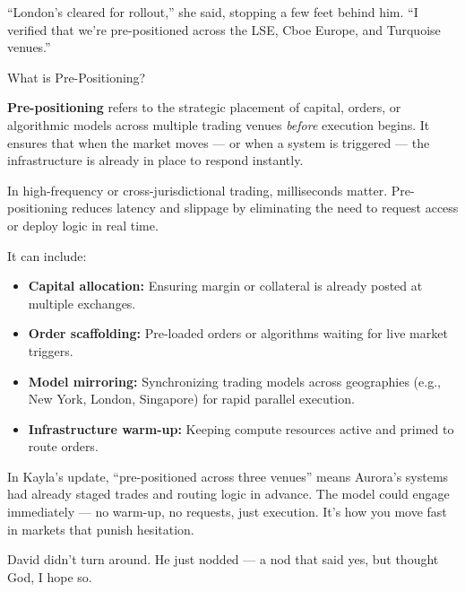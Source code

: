 \medskip

“London’s cleared for rollout,” she said, stopping a few feet behind him. “I verified that we’re pre-positioned 
across the LSE, Cboe Europe, and Turquoise venues.”

\medskip

\begin{TechnicalSidebar}{What is Pre-Positioning?}

  \textbf{Pre-positioning} refers to the strategic placement of capital, orders, or algorithmic models across multiple 
  trading venues \textit{before} execution begins.  
  It ensures that when the market moves — or when a system is triggered — the infrastructure is already in place to 
  respond instantly.

  \medskip

  In high-frequency or cross-jurisdictional trading, milliseconds matter.  
  Pre-positioning reduces latency and slippage by eliminating the need to request access or deploy logic in real time.

  \medskip

  It can include:

  \begin{itemize}
    \item \textbf{Capital allocation:} Ensuring margin or collateral is already posted at multiple exchanges.
    \item \textbf{Order scaffolding:} Pre-loaded orders or algorithms waiting for live market triggers.
    \item \textbf{Model mirroring:} Synchronizing trading models across geographies (e.g., New York, London, Singapore) 
    for rapid parallel execution.
    \item \textbf{Infrastructure warm-up:} Keeping compute resources active and primed to route orders.
  \end{itemize}

  \medskip

  In Kayla’s update, “pre-positioned across three venues” means Aurora’s systems had already staged trades and routing 
  logic in advance.  
  The model could engage immediately — no warm-up, no requests, just execution. It’s how you move fast in markets that 
  punish hesitation.

\end{TechnicalSidebar}

\medskip

David didn’t turn around. He just nodded — a nod that said yes, but thought God, I hope so.

